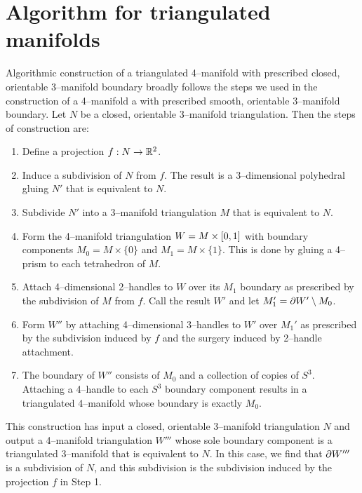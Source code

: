 \chapter{Algorithm for triangulated manifolds}
\label{chapter:triangulation}

Algorithmic construction of a triangulated 4--manifold with prescribed closed, orientable 3--manifold boundary broadly follows the steps we used in the construction of a 4--manifold a with prescribed smooth, orientable 3--manifold boundary.
Let $N$ be a closed, orientable 3--manifold triangulation.
Then the steps of construction are:
\begin{enumerate}
	\item Define a projection $f:N\to\mathbb{R}^2$.
	
	\item Induce a subdivision of $N$ from $f$.  The result is a 3--dimensional polyhedral gluing $N'$ that is equivalent to $N$.
	
	\item Subdivide $N'$ into a 3--manifold triangulation $M$ that is equivalent to $N$.
	
	\item Form the 4--manifold triangulation $W=M\times[0,1]$ with boundary components $M_0 = M\times\{0\}$ and $M_1 = M\times\{1\}$.  This is done by gluing a 4--prism to each tetrahedron of $M$.
	
	\item Attach 4--dimensional 2--handles to $W$ over its $M_1$ boundary as prescribed by the subdivision of $M$ from $f$.  Call the result $W'$ and let $M_1'=\partial W' \setminus M_0$.
	
	\item Form $W''$ by attaching 4--dimensional 3--handles to $W'$ over $M_1'$ as prescribed by the subdivision induced by $f$ and the surgery induced by 2--handle attachment.
	
	\item The boundary of $W''$ consists of $M_0$ and a collection of copies of $S^3$. Attaching a 4--handle to each $S^3$ boundary component results in a triangulated 4--manifold whose boundary is exactly $M_0$.
\end{enumerate}

This construction has input a closed, orientable 3--manifold triangulation $N$ and output a 4--manifold triangulation $W'''$ whose sole boundary component is a triangulated 3--manifold that is equivalent to $N$.
In this case, we find that $\partial W'''$ is a subdivision of $N$, and this subdivision is the subdivision induced by the projection $f$ in Step 1.

